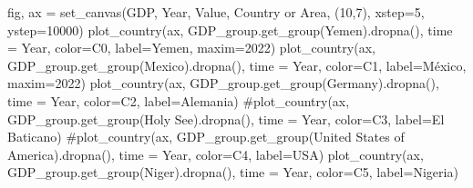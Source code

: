 \documentclass[
  letterpaper,
  DIV=11,
  numbers=noendperiod]{scrreprt}
\newenvironment{Shaded}{\begin{snugshade}}{\end{snugshade}}
\newcommand{\CommentTok}[1]{\textcolor[rgb]{0.37,0.37,0.37}{#1}}
\newcommand{\DecValTok}[1]{\textcolor[rgb]{0.68,0.00,0.00}{#1}}
\newcommand{\NormalTok}[1]{\textcolor[rgb]{0.00,0.23,0.31}{#1}}
\newcommand{\OperatorTok}[1]{\textcolor[rgb]{0.37,0.37,0.37}{#1}}
\newcommand{\StringTok}[1]{\textcolor[rgb]{0.13,0.47,0.30}{#1}}
\begin{document}
\begin{Shaded}
\begin{Highlighting}[]
\NormalTok{fig, ax }\OperatorTok{=}\NormalTok{ set\_canvas(GDP, }\StringTok{\textquotesingle{}Year\textquotesingle{}}\NormalTok{, }\StringTok{\textquotesingle{}Value\textquotesingle{}}\NormalTok{, }\StringTok{\textquotesingle{}Country or Area\textquotesingle{}}\NormalTok{, (}\DecValTok{10}\NormalTok{,}\DecValTok{7}\NormalTok{), xstep}\OperatorTok{=}\DecValTok{5}\NormalTok{, ystep}\OperatorTok{=}\DecValTok{10000}\NormalTok{)}
\NormalTok{plot\_country(ax, GDP\_group.get\_group(}\StringTok{\textquotesingle{}Yemen\textquotesingle{}}\NormalTok{).dropna(), time }\OperatorTok{=} \StringTok{\textquotesingle{}Year\textquotesingle{}}\NormalTok{, color}\OperatorTok{=}\StringTok{\textquotesingle{}C0\textquotesingle{}}\NormalTok{, label}\OperatorTok{=}\StringTok{\textquotesingle{}Yemen\textquotesingle{}}\NormalTok{, maxim}\OperatorTok{=}\DecValTok{2022}\NormalTok{)}
\NormalTok{plot\_country(ax, GDP\_group.get\_group(}\StringTok{\textquotesingle{}Mexico\textquotesingle{}}\NormalTok{).dropna(), time }\OperatorTok{=} \StringTok{\textquotesingle{}Year\textquotesingle{}}\NormalTok{, color}\OperatorTok{=}\StringTok{\textquotesingle{}C1\textquotesingle{}}\NormalTok{, label}\OperatorTok{=}\StringTok{\textquotesingle{}México\textquotesingle{}}\NormalTok{, maxim}\OperatorTok{=}\DecValTok{2022}\NormalTok{)}
\NormalTok{plot\_country(ax, GDP\_group.get\_group(}\StringTok{\textquotesingle{}Germany\textquotesingle{}}\NormalTok{).dropna(), time }\OperatorTok{=} \StringTok{\textquotesingle{}Year\textquotesingle{}}\NormalTok{, color}\OperatorTok{=}\StringTok{\textquotesingle{}C2\textquotesingle{}}\NormalTok{, label}\OperatorTok{=}\StringTok{\textquotesingle{}Alemania\textquotesingle{}}\NormalTok{)}
\CommentTok{\#plot\_country(ax, GDP\_group.get\_group(\textquotesingle{}Holy See\textquotesingle{}).dropna(), time = \textquotesingle{}Year\textquotesingle{}, color=\textquotesingle{}C3\textquotesingle{}, label=\textquotesingle{}El Baticano\textquotesingle{})}
\CommentTok{\#plot\_country(ax, GDP\_group.get\_group(\textquotesingle{}United States of America\textquotesingle{}).dropna(), time = \textquotesingle{}Year\textquotesingle{}, color=\textquotesingle{}C4\textquotesingle{}, label=\textquotesingle{}USA\textquotesingle{})}
\NormalTok{plot\_country(ax, GDP\_group.get\_group(}\StringTok{\textquotesingle{}Niger\textquotesingle{}}\NormalTok{).dropna(), time }\OperatorTok{=} \StringTok{\textquotesingle{}Year\textquotesingle{}}\NormalTok{, color}\OperatorTok{=}\StringTok{\textquotesingle{}C5\textquotesingle{}}\NormalTok{, label}\OperatorTok{=}\StringTok{\textquotesingle{}Nigeria\textquotesingle{}}\NormalTok{)}

\end{Highlighting}
\end{Shaded}
\end{document}
